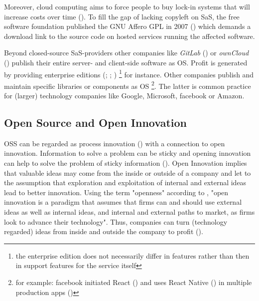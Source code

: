 Moreover, cloud computing aims to force people to buy lock-in systems that will increase costs over time (\cite{CloudComputingIsATrapWarnsGnuFound:online}). To fill the gap of lacking copyleft on SaS, the free software foundation published the GNU Affero GPL in 2007 (\cite{GNUAfferoGeneralPublicLicense:online}) which demands a download link to the source code on hosted services running the affected software.

Beyond closed-source SaS-providers other companies like \textit{GitLab} (\cite{gitlabraises1.5million:online}) or \textit{ownCloud} (\cite{diycorporatecloudwithowncloud:online}) publish their entire server- and client-side software as OS. Profit is generated by providing enterprise editions (\cite{gitlabraises1.5million:online}; \cite{ownCloudServerOrEnterpriseEdition:online}; \cite[p.148]{van2014gitlab}) \footnote{the enterprise edition does not necessarily differ in features rather than then in support features for the service itself} for instance. Other companies publish and maintain specific libraries or components as OS \footnote{for example: facebook initiated React (\cite{reactnativeannouncement:online}) and uses React Native (\cite{reactnative:online}) in multiple production apps (\cite{reactnativegithubreadme:online})}. The latter is common practice for (larger) technology companies like Google, Microsoft, facebook or Amazon.


\subsection{Open Source and Open Innovation}
\label{sec:open_source_and_open_innovation}

OSS can be regarded as process innovation (\cite{bonaccorsi2003open}) with a connection to open innovation. Information to solve a problem can be sticky and opening innovation can help to solve the problem of sticky information (\cite{von1994sticky}). Open Innovation implies that valuable ideas may come from the inside or outside of a company \cite[p.43f]{chesbrough2006open} and let to the assumption that exploration and exploitation of internal and external ideas lead to better innovation. Using the term "openness" according to \cite{chesbrough2003logic}, "open innovation is a paradigm that assumes that firms can and should use external ideas as well as internal ideas, and internal and external paths to market, as firms look to advance their technology". Thus, companies can turn (technology regarded) ideas from inside and outside the company to profit (\cite{dahlander2010open}).

